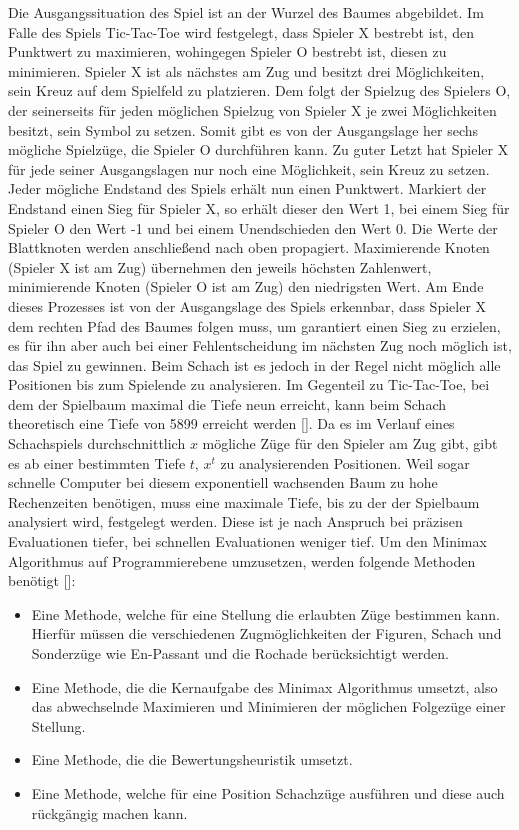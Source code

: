 Die Ausgangssituation des Spiel ist an der Wurzel des Baumes abgebildet.
Im Falle des Spiels Tic-Tac-Toe wird festgelegt, dass Spieler X bestrebt ist, den Punktwert zu maximieren, wohingegen Spieler O bestrebt ist, diesen zu minimieren.
Spieler X ist als nächstes am Zug und besitzt drei Möglichkeiten, sein Kreuz auf dem Spielfeld zu platzieren.
Dem folgt der Spielzug des Spielers O, der seinerseits für jeden möglichen Spielzug von Spieler X je zwei Möglichkeiten besitzt, sein Symbol zu setzen.
Somit gibt es von der Ausgangslage her sechs mögliche Spielzüge, die Spieler O durchführen kann.
Zu guter Letzt hat Spieler X für jede seiner Ausgangslagen nur noch eine Möglichkeit, sein Kreuz zu setzen.
Jeder mögliche Endstand des Spiels erhält nun einen Punktwert.
Markiert der Endstand einen Sieg für Spieler X, so erhält dieser den Wert 1, bei einem Sieg für Spieler O den Wert -1 und bei einem Unendschieden den Wert 0.
Die Werte der Blattknoten werden anschließend nach oben propagiert.
Maximierende Knoten (Spieler X ist am Zug) übernehmen den jeweils höchsten Zahlenwert, minimierende Knoten (Spieler O ist am Zug) den niedrigsten Wert.
Am Ende dieses Prozesses ist von der Ausgangslage des Spiels erkennbar, dass Spieler X dem rechten Pfad des Baumes folgen muss, um garantiert einen Sieg zu erzielen, es für ihn aber auch bei einer Fehlentscheidung im nächsten Zug noch möglich ist, das Spiel zu gewinnen.
Beim Schach ist es jedoch in der Regel nicht möglich alle Positionen bis zum Spielende zu analysieren.
Im Gegenteil zu Tic-Tac-Toe, bei dem der Spielbaum maximal die Tiefe neun erreicht, kann beim Schach theoretisch eine Tiefe von 5899 erreicht werden [\cite{Wikipedia2018}].
Da es im Verlauf eines Schachspiels durchschnittlich $x$ mögliche Züge für den Spieler am Zug gibt, gibt es ab einer bestimmten Tiefe $t$, $x^t$ zu analysierenden Positionen.
Weil sogar schnelle Computer bei diesem exponentiell wachsenden Baum zu hohe Rechenzeiten benötigen, muss eine maximale Tiefe, bis zu der der Spielbaum analysiert wird, festgelegt werden.
Diese ist je nach Anspruch bei präzisen Evaluationen tiefer, bei schnellen Evaluationen weniger tief.
Um den Minimax Algorithmus auf Programmierebene umzusetzen, werden folgende Methoden benötigt [\cite{Shannon1950}]:

\begin{itemize}
    \item Eine Methode, welche für eine Stellung die erlaubten Züge bestimmen kann. Hierfür müssen die verschiedenen Zugmöglichkeiten der Figuren, Schach und Sonderzüge wie En-Passant und die Rochade berücksichtigt werden.
    \item Eine Methode, die die Kernaufgabe des Minimax Algorithmus umsetzt, also das abwechselnde Maximieren und Minimieren der möglichen Folgezüge einer Stellung.
    \item Eine Methode, die die Bewertungsheuristik umsetzt.
    \item Eine Methode, welche für eine Position Schachzüge ausführen und diese auch rückgängig machen kann.
\end{itemize}

